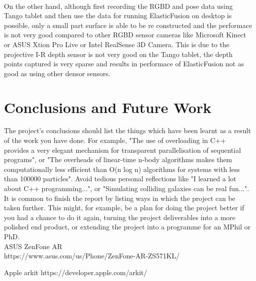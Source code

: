 \documentclass[12pt,twoside]{article}
\begin{document}
\\
On the other hand, although first recording the RGBD and pose data using Tango tablet and then use the data for running ElasticFusion on desktop is possible, only a small part surface is able to be re constructed and the performace is not very good compared to other RGBD sensor cameras like Microsoft Kinect or ASUS Xtion Pro Live or Intel RealSense 3D Camera. This is due to the projective I-R depth sensor is not very good on the Tango tablet, the depth points captured is very sparse and results in performace of ElasticFusion not as good as using other densor sensors.\\



\newpage




\section{Conclusions and Future Work}

The project's conclusions should list the things which have been learnt as a result of the work you have done. For example, "The use of overloading in C++ provides a very elegant mechanism for transparent parallelisation of sequential programs", or "The overheads of linear-time n-body algorithms makes them computationally less efficient than O(n log n) algorithms for systems with less than 100000 particles". Avoid tedious personal reflections like "I learned a lot about C++ programming...", or "Simulating colliding galaxies can be real fun...". It is common to finish the report by listing ways in which the project can be taken further. This might, for example, be a plan for doing the project better if you had a chance to do it again, turning the project deliverables into a more polished end product, or extending the project into a programme for an MPhil or PhD.\\

ASUS ZenFone AR\\
https://www.asus.com/us/Phone/ZenFone-AR-ZS571KL/

Apple arkit
https://developer.apple.com/arkit/
\end{document}
